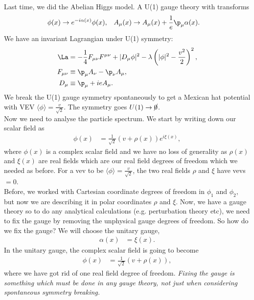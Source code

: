 \documentclass[relqm.tex]{subfiles}
\begin{document}
\chapter{}
Last time, we did the Abelian Higgs model.
A U(1) gauge theory with transforms
\begin{align}
    \phi(x) &\to e^{-i\alpha(x)}\phi(x), & A_\mu(x) &\to A_\mu(x)+\frac{1}{e}\p_\mu\alpha(x).
\end{align}
We have an invariant Lagrangian under U(1) symmetry:
\begin{align}
    \La &= -\frac14F_{\mu\nu}F^{\mu\nu} + |D_\mu\phi|^2 - \lambda\left(|\phi|^2-\frac{v^2}{2}\right)^2,\\
    F_{\mu\nu} &\equiv \p_\mu A_\nu - \p_\nu A_\mu, \\
    D_\mu &\equiv \p_\mu + ieA_\mu.
\end{align}
We break the U(1) gauge symmetry spontaneously to get a Mexican hat potential with VEV $\langle\phi\rangle=\frac{v}{\sqrt{2}}$. 
The symmetry goes $U(1)\to\cancel{0}$.\\
Now we need to analyse the particle spectrum. 
We start by writing down our scalar field as 
\begin{align}
    \phi(x) &= \frac{1}{\sqrt{2}}\left(v+\rho(x)\right)e^{i\xi(x)},
\end{align}
where $\phi(x)$ is a complex scalar field and we have no loss of generality as $\rho(x)$ and $\xi(x)$ are real fields which are our real field degrees of freedom which we needed as before. 
For a vev to be $\langle\phi\rangle=\frac{v}{\sqrt{2}}$, the two real fields $\rho$ and $\xi$ have vevs $=0$.\\
Before, we worked with Cartesian coordinate degrees of freedom in $\phi_1$ and $\phi_2$, but now we are describing it in polar coordinates $\rho$ and $\xi$.
Now, we have a gauge theory so to do any analytical calculations (e.g. perturbation theory etc), we need to fix the gauge by removing the unphysical gauge degrees of freedom.
So how do we fix the gauge?
We will choose the unitary gauge, 
\begin{align}
    \alpha(x) &= \xi(x).
\end{align}
In the unitary gauge, the complex scalar field is going to become
\begin{align}
    \phi(x) &= \frac{1}{\sqrt{2}}(v+\rho(x)),
\end{align}
where we have got rid of one real field degree of freedom. 
\emph{Fixing the gauge is something which must be done in any gauge theory, not just when considering spontaneous symmetry breaking.}\\
\end{document}
